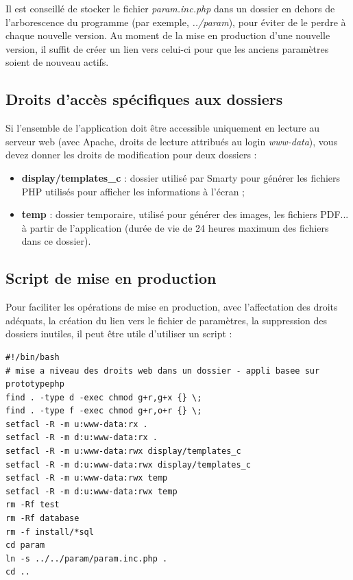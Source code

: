 Il est conseillé de stocker le fichier \textit{param.inc.php} dans un dossier en dehors de l'arborescence du programme (par exemple, \textit{../param}), pour éviter de le perdre à chaque nouvelle version. 
Au moment de la mise en production d'une nouvelle version, il suffit de créer un lien vers celui-ci pour que les anciens paramètres soient de nouveau actifs.

\subsection{Droits d'accès spécifiques aux dossiers}
Si l'ensemble de l'application doit être accessible uniquement en lecture au serveur web (avec Apache, droits de lecture attribués au login \textit{www-data}), vous devez donner les droits de modification pour deux dossiers :
\begin{itemize}
\item \textbf{display/templates\_c} : dossier utilisé par Smarty pour générer les fichiers PHP utilisés pour afficher les informations à l'écran ;
\item \textbf{temp} : dossier temporaire, utilisé pour générer des images, les fichiers PDF... à partir de l'application (durée de vie de 24 heures maximum des fichiers dans ce dossier).
\end{itemize}

\subsection{Script de mise en production}

Pour faciliter les opérations de mise en production, avec l'affectation des droits adéquats, la création du lien vers le fichier de paramètres, la suppression des dossiers inutiles, il peut être utile d'utiliser un script :

\begin{lstlisting}
#!/bin/bash
# mise a niveau des droits web dans un dossier - appli basee sur prototypephp
find . -type d -exec chmod g+r,g+x {} \;
find . -type f -exec chmod g+r,o+r {} \;
setfacl -R -m u:www-data:rx .
setfacl -R -m d:u:www-data:rx .
setfacl -R -m u:www-data:rwx display/templates_c
setfacl -R -m d:u:www-data:rwx display/templates_c
setfacl -R -m u:www-data:rwx temp
setfacl -R -m d:u:www-data:rwx temp
rm -Rf test
rm -Rf database
rm -f install/*sql
cd param
ln -s ../../param/param.inc.php .
cd ..

\end{lstlisting}


